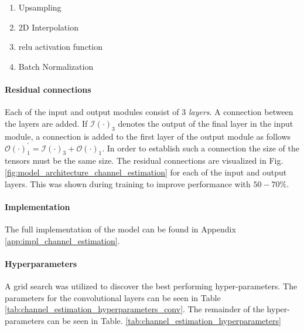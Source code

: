 \begin{enumerate}
    \item Upsampling
    \item 2D Interpolation
    \item \gls{relu} activation function
    \item Batch Normalization
\end{enumerate}


\paragraph{Residual connections}
Each of the input and output modules consist of 3 \emph{layers}. A connection between the layers are added. If $\mathcal{I}(\cdot)_3$ denotes the output of the final layer in the input module, a connection is added to the first layer of the output module as follows $\mathcal{O}(\cdot)_{1}^{'} = \mathcal{I}(\cdot)_3  + \mathcal{O}(\cdot)_1$. In order to establish such a connection the size of the tensors must be the same size. The residual connections are visualized in Fig. \ref{fig:model_architecture_channel_estimation} for each of the input and output layers. This was shown during training to improve performance with $50-70\%$.

\paragraph{Implementation}
The full implementation of the model can be found in Appendix \ref{app:impl_channel_estimation}.


\paragraph{Hyperparameters}
A grid search was utilized to discover the best performing hyper-parameters. The parameters for the convolutional layers can be seen in Table \ref{tab:channel_estimation_hyperparameters_conv}. The remainder of the hyper-parameters can be seen in Table. \ref{tab:channel_estimation_hyperparameters}


